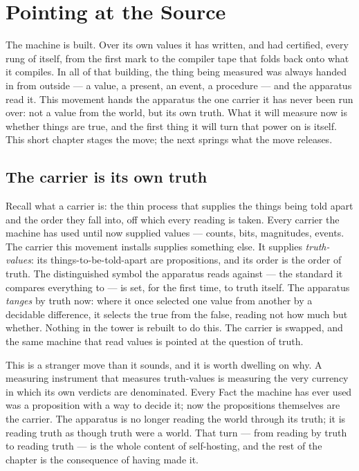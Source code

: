\chapter{Pointing at the Source}
\label{chap:pointing-at-the-source}

The machine is built. Over its own values it has written, and had certified, every rung of itself, from
the first mark to the compiler tape that folds back onto what it compiles. In all of that building, the
thing being measured was always handed in from outside --- a value, a present, an event, a procedure ---
and the apparatus read it. This movement hands the apparatus the one carrier it has never been run over:
not a value from the world, but its own truth. What it will measure now is whether things are true, and the
first thing it will turn that power on is itself. This short chapter stages the move; the next springs what
the move releases.

\section{The carrier is its own truth}
\label{se:carrier-is-its-own-truth}

Recall what a carrier is: the thin process that supplies the things being told apart and the order they
fall into, off which every reading is taken. Every carrier the machine has used until now supplied values
--- counts, bits, magnitudes, events. The carrier this movement installs supplies something else. It
supplies \emph{truth-values}: its things-to-be-told-apart are propositions, and its order is the order of
truth. The distinguished symbol the apparatus reads against --- the standard it compares everything to ---
is set, for the first time, to truth itself. The apparatus \emph{tanges} by truth now: where it once
selected one value from another by a decidable difference, it selects the true from the false, reading not
how much but whether. Nothing in the tower is rebuilt to do this. The carrier is swapped, and the same
machine that read values is pointed at the question of truth.

This is a stranger move than it sounds, and it is worth dwelling on why. A measuring instrument that
measures truth-values is measuring the very currency in which its own verdicts are denominated. Every Fact
the machine has ever used was a proposition with a way to decide it; now the propositions themselves are
the carrier. The apparatus is no longer reading the world through its truth; it is reading truth as though
truth were a world. That turn --- from reading by truth to reading truth --- is the whole content of
self-hosting, and the rest of the chapter is the consequence of having made it.

